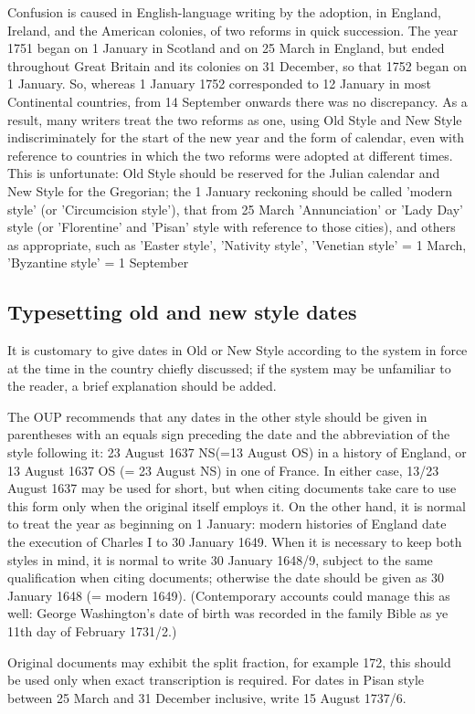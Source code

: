 Confusion is caused in English-language writing by the adoption, in
England, Ireland, and the American colonies, of two reforms in quick
succession. The year 1751 began on 1 January in Scotland and on 25
March in England, but ended throughout Great Britain and its colonies
on 31 December, so that 1752 began on 1 January. So, whereas 1 January
1752 corresponded to 12 January in most Continental countries, from 14
September onwards there was no discrepancy.
As a result, many writers treat the two reforms as one, using Old Style
and New Style indiscriminately for the start of the new year and the
form of calendar, even with reference to countries in which the two
reforms were adopted at different times. This is unfortunate: Old Style
should be reserved for the Julian calendar and New Style for the Gregorian;
the 1 January reckoning should be called 'modern style' (or 'Circumcision
style'), that from 25 March 'Annunciation' or 'Lady Day' style (or
'Florentine' and 'Pisan' style with reference to those cities), and others
as appropriate, such as 'Easter style', 'Nativity style', 'Venetian style' =
1 March, 'Byzantine style' = 1 September

\subsection{Typesetting old and new style dates}

It is customary to give dates in Old or New Style according to the system
in force at the time in the country chiefly discussed; if the system may be
unfamiliar to the reader, a brief explanation should be added.

The OUP recommends that any dates
in the other style should be given in parentheses with an equals sign
preceding the date and the abbreviation of the style following it: 23
August 1637 NS(=13 August OS) in a history of England, or 13 August 1637
OS (= 23 August NS) in one of France. In either case, 13/23 August 1637 may
be used for short, but when citing documents take care to use this form
only when the original itself employs it. On the other hand, it is normal
to treat the year as beginning on 1 January: modern histories of England
date the execution of Charles I to 30 January 1649. When it is necessary to
keep both styles in mind, it is normal to write 30 January 1648/9, subject to
the same qualification when citing documents; otherwise the date
should be given as 30 January 1648 (= modern 1649). (Contemporary accounts
could manage this as well: George Washington's date of birth was
recorded in the family Bible as ye 11th day of February 1731/2.) 

Original
documents may exhibit the split fraction, for example 172, this should
be used only when exact transcription is required. For dates in Pisan style
between 25 March and 31 December inclusive, write 15 August 1737/6. 









